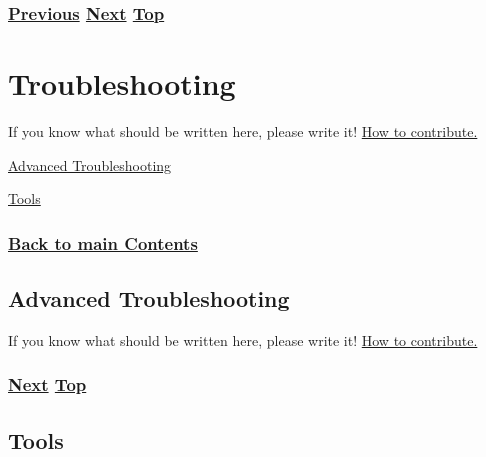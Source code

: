 \documentclass[
]{article}
\begin{document}
\subsubsection{\texorpdfstring{\hyperref[deployment-in-the-home]{Previous}
\hyperref[troubleshooting]{Next}
\hyperref[deployment-status]{Top}}{Previous Next Top}}\label{previous-next-top-37}

\pagebreak

\section{Troubleshooting}\label{troubleshooting}

If you know what should be written here, please write it!
\href{https://github.com/becarpenter/book6/blob/main/1.\%20Introduction\%20and\%20Foreword/How\%20to\%20contribute.md\#how-to-contribute}{How
to contribute.}

\hyperref[advanced-troubleshooting]{Advanced Troubleshooting}

\hyperref[tools]{Tools}

\subsubsection{\texorpdfstring{\hyperref[list-of-contents]{Back to main
Contents}}{Back to main Contents}}\label{back-to-main-contents-8}

\pagebreak

\subsection{Advanced Troubleshooting}\label{advanced-troubleshooting}

If you know what should be written here, please write it!
\href{https://github.com/becarpenter/book6/blob/main/1.\%20Introduction\%20and\%20Foreword/How\%20to\%20contribute.md\#how-to-contribute}{How
to contribute.}

\subsubsection{\texorpdfstring{\hyperref[tools]{Next}
\hyperref[troubleshooting]{Top}}{Next Top}}\label{next-top-8}

\pagebreak

\subsection{Tools}\label{tools}
\end{document}
